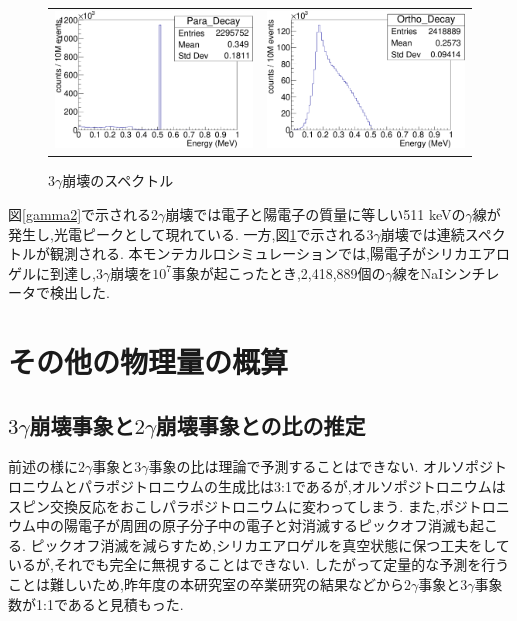 \begin{figure}[htbp]
	\begin{tabular}{cc}

	\centering
		\begin{minipage}{0.5\hsize}
		\includegraphics[width=7cm]{fig/gamma2.pdf}
	\caption{$2\gamma$崩壊のスペクトル}
	\label{gamma2}
		\end{minipage}&

		\begin{minipage}{0.5\hsize}
	\centering
		\includegraphics[width=7cm]{fig/gamma3.pdf}
	\caption{$3\gamma$崩壊のスペクトル}
	\label{gamma3}
		\end{minipage}

		\end{tabular}
\end{figure}

図\ref{gamma2}で示される2$\gamma$崩壊では電子と陽電子の質量に等しい511 keVの$\gamma$線が発生し,光電ピークとして現れている.
一方,図\ref{gamma3}で示される$3\gamma$崩壊では連続スペクトルが観測される.
本モンテカルロシミュレーションでは,陽電子がシリカエアロゲルに到達し,$3\gamma$崩壊を$10^7$事象が起こったとき,2,418,889個の$\gamma$線をNaIシンチレータで検出した.


\section{その他の物理量の概算}
\label{section_other}

\subsection{$3\gamma$崩壊事象と$2\gamma$崩壊事象との比の推定}
前述の様に$2\gamma$事象と$3\gamma$事象の比は理論で予測することはできない.
オルソポジトロニウムとパラポジトロニウムの生成比は3:1であるが,オルソポジトロニウムはスピン交換反応をおこしパラポジトロニウムに変わってしまう.
また,ポジトロニウム中の陽電子が周囲の原子分子中の電子と対消滅するピックオフ消滅も起こる.
ピックオフ消滅を減らすため,シリカエアロゲルを真空状態に保つ工夫をしているが,それでも完全に無視することはできない.
したがって定量的な予測を行うことは難しいため,昨年度の本研究室の卒業研究の結果などから$2\gamma$事象と$3\gamma$事象数が1:1であると見積もった.

